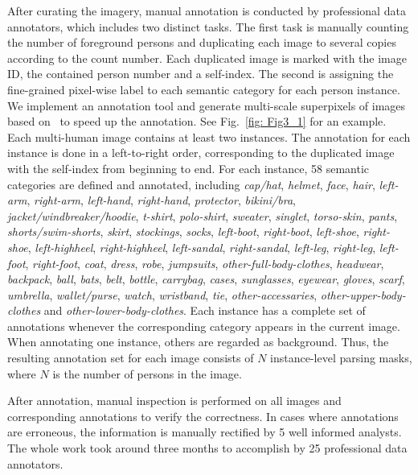 \documentclass[10pt,twocolumn,letterpaper]{article}
\theoremstyle{definition}
\theoremstyle{remark}
\begin{document}
After curating the imagery, manual annotation is conducted by professional data annotators, which includes two distinct tasks. The first task is manually counting the number of foreground persons and duplicating each image to several copies according to the count number. Each duplicated image is marked with the image ID, the contained person number and a self-index. The second is assigning the fine-grained pixel-wise label to each semantic category for each person instance. We implement an annotation tool and generate multi-scale superpixels of images based on~\cite{arbelaez2011contour} to speed up the annotation. See Fig.~\ref{fig: Fig3_1} for an example. Each multi-human image contains at least two instances. The annotation for each instance is done in a left-to-right order, corresponding to the duplicated image with the self-index from beginning to end. For each instance, 58 semantic categories are defined and annotated, including \emph{cap/hat}, \emph{helmet}, \emph{face}, \emph{hair}, \emph{left-arm}, \emph{right-arm}, \emph{left-hand}, \emph{right-hand}, \emph{protector}, \emph{bikini/bra}, \emph{jacket/windbreaker/hoodie}, \emph{t-shirt}, \emph{polo-shirt}, \emph{sweater}, \emph{singlet}, \emph{torso-skin}, \emph{pants}, \emph{shorts/swim-shorts}, \emph{skirt}, \emph{stockings}, \emph{socks}, \emph{left-boot}, \emph{right-boot}, \emph{left-shoe}, \emph{right-shoe}, \emph{left-highheel}, \emph{right-highheel}, \emph{left-sandal}, \emph{right-sandal}, \emph{left-leg}, \emph{right-leg}, \emph{left-foot}, \emph{right-foot}, \emph{coat}, \emph{dress}, \emph{robe}, \emph{jumpsuits}, \emph{other-full-body-clothes}, \emph{headwear}, \emph{backpack}, \emph{ball}, \emph{bats}, \emph{belt}, \emph{bottle}, \emph{carrybag}, \emph{cases}, \emph{sunglasses}, \emph{eyewear}, \emph{gloves}, \emph{scarf}, \emph{umbrella}, \emph{wallet/purse}, \emph{watch}, \emph{wristband}, \emph{tie}, \emph{other-accessaries}, \emph{other-upper-body-clothes} and \emph{other-lower-body-clothes}. Each instance has a complete set of annotations whenever the corresponding category appears in the current image. When annotating one instance, others are regarded as background. Thus, the resulting annotation set for each image consists of $N$ instance-level parsing masks, where $N$ is the number of persons in the image.

After annotation, manual inspection is performed on all images and corresponding annotations to verify the correctness. In cases where annotations are erroneous, the information is manually rectified by 5 well informed analysts. The whole work took around three months to accomplish by 25 professional data annotators.
\end{document}
